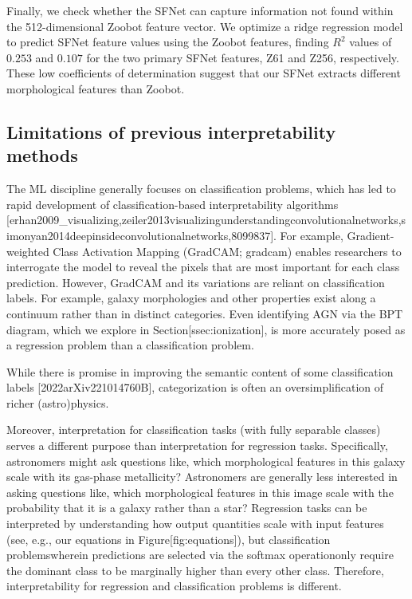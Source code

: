 \documentclass[11pt,a4paper]{article}
\begin{document}
Finally, we check whether the SFNet can capture information not found within the 512-dimensional Zoobot feature vector. We optimize a ridge regression model to predict SFNet feature values  using the Zoobot features, finding $R^2$ values of $0.253$ and $0.107$ for the two primary SFNet features, Z61 and Z256, respectively. These low coefficients of determination suggest that our SFNet extracts different morphological features than Zoobot.

\subsection{Limitations of previous interpretability methods}

The ML discipline generally focuses on classification problems, which has led to rapid development of classification-based interpretability algorithms [erhan2009\_visualizing,zeiler2013visualizingunderstandingconvolutionalnetworks,simonyan2014deepinsideconvolutionalnetworks,8099837]. For example, Gradient-weighted Class Activation Mapping (GradCAM; gradcam) enables researchers to interrogate the model to reveal the pixels that are most important for each class prediction. However, GradCAM and its variations are reliant on classification labels. For example, galaxy morphologies and other properties exist along a continuum rather than in distinct categories. Even identifying AGN via the BPT diagram, which we explore in Section[ssec:ionization], is more accurately posed as a regression problem than a classification problem.

While there is promise in improving the semantic content of some classification labels [2022arXiv221014760B], categorization is often an oversimplification of richer (astro)physics.

Moreover, interpretation for classification tasks (with fully separable classes) serves a different purpose than interpretation for regression tasks. Specifically, astronomers might ask questions like, which morphological features in this galaxy scale with its gas-phase metallicity? Astronomers are generally less interested in asking questions like, which morphological features in this image scale with the probability that it is a galaxy rather than a star? Regression tasks can be interpreted by understanding how output quantities scale with input features (see, e.g., our equations in Figure[fig:equations]), but classification problemswherein predictions are selected via the softmax operationonly require the dominant class to be marginally higher than every other class. Therefore, interpretability for regression and classification problems is different.
\end{document}
